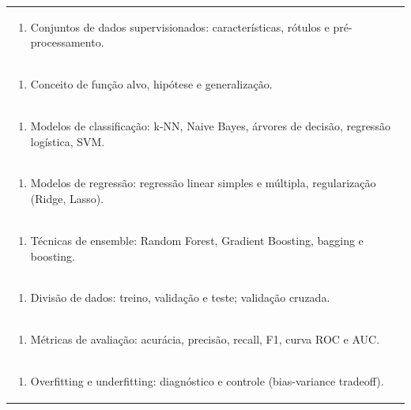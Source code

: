 \documentclass[11pt]{article}
\begin{document}
\begin{center}
\begin{longtable}{|p{4cm}|p{4cm}|p{4cm}|p{4cm}|}
\multicolumn{4}{|p{\dimexpr 16cm + 6\tabcolsep\relax}|}{\begin{enumerate}[start=2]\item Conjuntos de dados supervisionados: características, rótulos e pré-processamento.\end{enumerate}}\\
\multicolumn{4}{|p{\dimexpr 16cm + 6\tabcolsep\relax}|}{\begin{enumerate}[start=3]\item Conceito de função alvo, hipótese e generalização.\end{enumerate}}\\
\multicolumn{4}{|p{\dimexpr 16cm + 6\tabcolsep\relax}|}{\begin{enumerate}[start=4]\item Modelos de classificação: k-NN, Naive Bayes, árvores de decisão, regressão logística, SVM.\end{enumerate}}\\
\multicolumn{4}{|p{\dimexpr 16cm + 6\tabcolsep\relax}|}{\begin{enumerate}[start=5]\item Modelos de regressão: regressão linear simples e múltipla, regularização (Ridge, Lasso).\end{enumerate}}\\
\multicolumn{4}{|p{\dimexpr 16cm + 6\tabcolsep\relax}|}{\begin{enumerate}[start=6]\item Técnicas de ensemble: Random Forest, Gradient Boosting, bagging e boosting.\end{enumerate}}\\
\multicolumn{4}{|p{\dimexpr 16cm + 6\tabcolsep\relax}|}{\begin{enumerate}[start=7]\item Divisão de dados: treino, validação e teste; validação cruzada.\end{enumerate}}\\
\multicolumn{4}{|p{\dimexpr 16cm + 6\tabcolsep\relax}|}{\begin{enumerate}[start=8]\item Métricas de avaliação: acurácia, precisão, recall, F1, curva ROC e AUC.\end{enumerate}}\\
\multicolumn{4}{|p{\dimexpr 16cm + 6\tabcolsep\relax}|}{\begin{enumerate}[start=9]\item Overfitting e underfitting: diagnóstico e controle (bias-variance tradeoff).\end{enumerate}}\\

\end{longtable}
\end{center}
\end{document}
